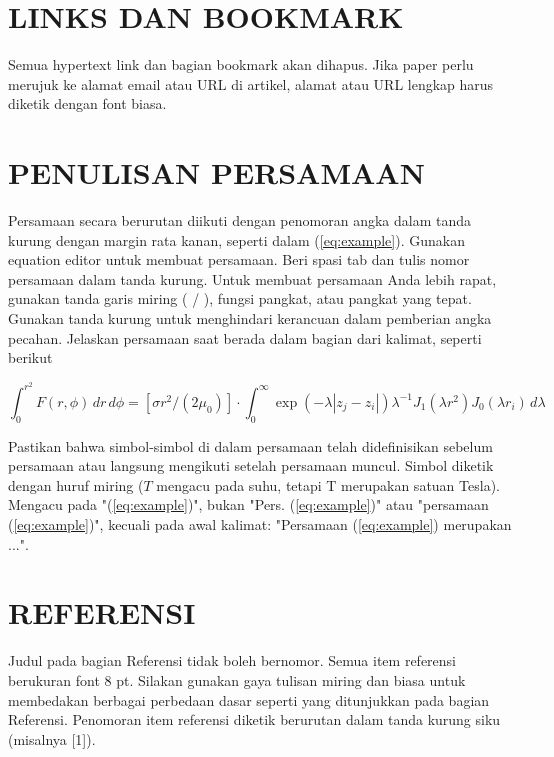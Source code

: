 \documentclass[10pt,twocolumn]{article}
\begin{document}
\twocolumn[
\begin{@twocolumnfalse}

\vspace{1em}
\end{@twocolumnfalse}
]








\section{\MakeUppercase{Links dan Bookmark}}
Semua hypertext link dan bagian bookmark akan dihapus. Jika paper perlu merujuk ke alamat email atau URL di artikel, alamat atau URL lengkap harus diketik dengan font biasa.

\section{\MakeUppercase{Penulisan Persamaan}}
Persamaan secara berurutan diikuti dengan penomoran angka dalam tanda kurung dengan margin rata kanan, seperti dalam (\ref{eq:example}). Gunakan equation editor untuk membuat persamaan. Beri spasi tab dan tulis nomor persamaan dalam tanda kurung. Untuk membuat persamaan Anda lebih rapat, gunakan tanda garis miring ( / ), fungsi pangkat, atau pangkat yang tepat. Gunakan tanda kurung untuk menghindari kerancuan dalam pemberian angka pecahan. Jelaskan persamaan saat berada dalam bagian dari kalimat, seperti berikut

\begin{equation}
\int_0^{r^2} F(r,\phi) \, dr \, d\phi = [\sigma r^2/(2\mu_0)] \cdot \int_0^{\infty} \exp(-\lambda|z_j - z_i|) \lambda^{-1} J_1(\lambda r^2) J_0(\lambda r_i) \, d\lambda
\label{eq:example}
\end{equation}

Pastikan bahwa simbol-simbol di dalam persamaan telah didefinisikan sebelum persamaan atau langsung mengikuti setelah persamaan muncul. Simbol diketik dengan huruf miring ($T$ mengacu pada suhu, tetapi T merupakan satuan Tesla). Mengacu pada "(\ref{eq:example})", bukan "Pers. (\ref{eq:example})" atau "persamaan (\ref{eq:example})", kecuali pada awal kalimat: "Persamaan (\ref{eq:example}) merupakan ...".

\section{\MakeUppercase{Referensi}}
Judul pada bagian Referensi tidak boleh bernomor. Semua item referensi berukuran font 8 pt. Silakan gunakan gaya tulisan miring dan biasa untuk membedakan berbagai perbedaan dasar seperti yang ditunjukkan pada bagian Referensi. Penomoran item referensi diketik berurutan dalam tanda kurung siku (misalnya [1]).
\end{document}
